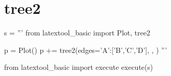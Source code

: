 \section{tree2}

\begin{python}
s = '''
from latextool_basic import Plot, tree2

p = Plot()
p += tree2(edges={'A':['B','C','D'],
                 },
          )
'''

from latextool_basic import execute
execute(s)
\end{python}
